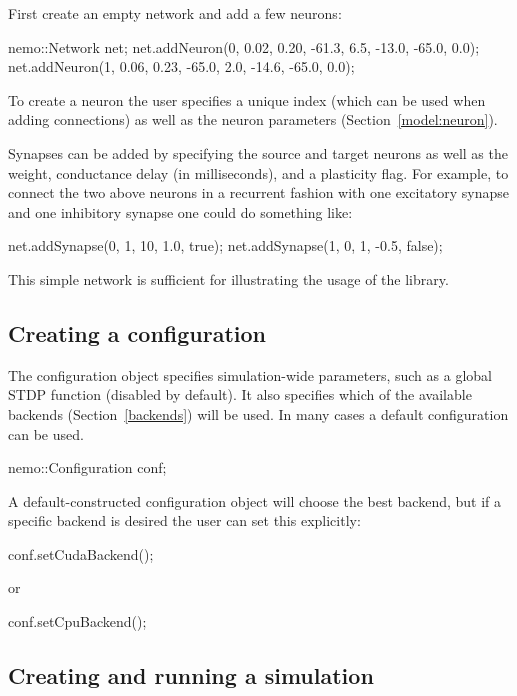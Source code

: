 \documentclass[a4paper]{article}
\begin{document}
First create an empty network and add a few neurons:

\begin{ccode}
nemo::Network net;
net.addNeuron(0, 0.02, 0.20, -61.3, 6.5, -13.0, -65.0, 0.0);
net.addNeuron(1, 0.06, 0.23, -65.0, 2.0, -14.6, -65.0, 0.0);
\end{ccode}

To create a neuron the user specifies a unique index
	(which can be used when adding connections)
	as well as the neuron parameters (Section~\ref{model:neuron}).

Synapses can be added by specifying the source and target neurons as well as
	the weight, conductance delay (in milliseconds), and a plasticity flag.
For example, to connect the two above neurons in a recurrent fashion
	with one excitatory synapse and one inhibitory synapse one could do something like:

\begin{ccode}
net.addSynapse(0, 1, 10, 1.0, true);
net.addSynapse(1, 0, 1, -0.5, false);
\end{ccode}

This simple network is sufficient for illustrating the usage of the library. 

\subsection{Creating a configuration}

The configuration object specifies simulation-wide parameters, 
	such as a global STDP function (disabled by default).
It also specifies which of the available backends (Section~\ref{backends}) will be used. 
In many cases a default configuration can be used.

\begin{ccode}
nemo::Configuration conf;
\end{ccode}

A default-constructed configuration object will choose the best backend,
	but if a specific backend is desired the user can set this explicitly:

\begin{ccode}
conf.setCudaBackend();
\end{ccode}

or

\begin{ccode}
conf.setCpuBackend();
\end{ccode}

\subsection{Creating and running a simulation}
\end{document}
